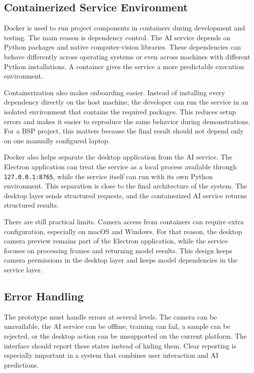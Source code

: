 \documentclass[10pt,twocolumn]{article}
\begin{document}
\subsection{Containerized Service Environment}
Docker is used to run project components in containers during development and testing.
The main reason is dependency control.
The AI service depends on Python packages and native computer-vision libraries.
These dependencies can behave differently across operating systems or even across machines with different Python installations.
A container gives the service a more predictable execution environment.

Containerization also makes onboarding easier.
Instead of installing every dependency directly on the host machine, the developer can run the service in an isolated environment that contains the required packages.
This reduces setup errors and makes it easier to reproduce the same behavior during demonstrations.
For a BSP project, this matters because the final result should not depend only on one manually configured laptop.

Docker also helps separate the desktop application from the AI service.
The Electron application can treat the service as a local process available through \texttt{127.0.0.1:8765}, while the service itself can run with its own Python environment.
This separation is close to the final architecture of the system.
The desktop layer sends structured requests, and the containerized AI service returns structured results.

There are still practical limits.
Camera access from containers can require extra configuration, especially on macOS and Windows.
For that reason, the desktop camera preview remains part of the Electron application, while the service focuses on processing frames and returning model results.
This design keeps camera permissions in the desktop layer and keeps model dependencies in the service layer.

\subsection{Error Handling}
The prototype must handle errors at several levels.
The camera can be unavailable, the AI service can be offline, training can fail, a sample can be rejected, or the desktop action can be unsupported on the current platform.
The interface should report these states instead of hiding them.
Clear reporting is especially important in a system that combines user interaction and AI predictions.
\end{document}
